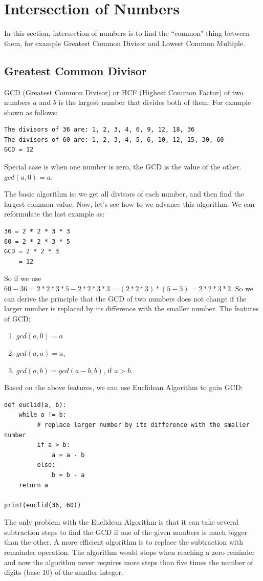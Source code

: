 \documentclass[../main.tex]{subfiles}
\begin{document}
\section{Intersection of Numbers}
In this section, intersection of numbers is to find the ``common" thing between them, for example Greatest Common Divisor and Lowest Common Multiple. 
\subsection{Greatest Common Divisor}
GCD (Greatest Common Divisor) or HCF (Highest Common Factor) of two numbers $a$ and $b$ is the largest number that divides both of them. For example shown as follows:
\begin{lstlisting}
The divisors of 36 are: 1, 2, 3, 4, 6, 9, 12, 18, 36
The divisors of 60 are: 1, 2, 3, 4, 5, 6, 10, 12, 15, 30, 60
GCD = 12
\end{lstlisting}
Special case is when one number is zero, the GCD is the value of the other. $gcd(a, 0) = a$. 

The basic algorithm is: we get all divisors of each number, and then find the largest common value. Now, let's see how to we advance this algorithm.  We can reformulate the last example as:
\begin{lstlisting}
36 = 2 * 2 * 3 * 3
60 = 2 * 2 * 3 * 5
GCD = 2 * 2 * 3
    = 12
\end{lstlisting}
So if we use $60-36 = 2*2*3*5 - 2*2*3*3 = (2*2*3)*(5-3) = 2*2*3*2$. So we can derive the principle that the GCD of two numbers does not change if the larger number is replaced by its difference with the smaller number.  The features of GCD:
\begin{enumerate}
    \item $gcd(a, 0) = a$
    \item $gcd(a, a) = a$,
    \item $gcd(a, b) = gcd(a-b, b)$, if $a>b$.
\end{enumerate}
Based on the above features, we can use Euclidean Algorithm to gain GCD:
\begin{lstlisting}
def euclid(a, b):
    while a != b:
         # replace larger number by its difference with the smaller number
         if a > b:
             a = a - b
         else:
             b = b - a
    return a
    
print(euclid(36, 60))
\end{lstlisting}
The only problem with the Euclidean Algorithm is that it can take several subtraction steps to find the GCD if one of the given numbers is much bigger than the other. A more efficient algorithm is to replace the subtraction with remainder operation. The algorithm would stops when reaching a zero reminder and now the algorithm never requires more steps than five times the number of digits (base 10) of the smaller integer. 
\end{document}
